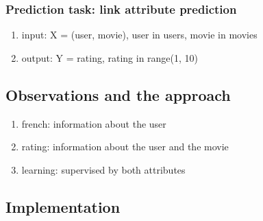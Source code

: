 \documentclass{article}
\begin{document}
\subsubsection{Prediction task: link attribute prediction}
\begin{enumerate}
	\item input: X = (user, movie), user in users, movie in movies
	\item output: Y = rating, rating in range(1, 10)
\end{enumerate}

\subsection{Observations and the approach}
\begin{enumerate}
	\item french: information about the user
	\item rating: information about the user and the movie
	\item learning: supervised by both attributes
\end{enumerate}

\subsection{Implementation}
\end{document}

